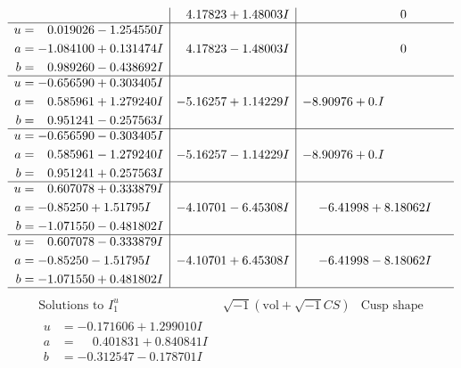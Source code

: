\documentclass[1p]{elsarticle_modified}
\theoremstyle{definition}
\newcommand{\I}{\sqrt{-1}}
\begin{document}
$$\begin{array}{c|c|c}
 & \phantom{-}4.17823 + 1.48003 I & \phantom{-0.000000 } 0 \\ \hline\begin{aligned}
u &= \phantom{-}0.019026 - 1.254550 I \\
a &= -1.084100 + 0.131474 I \\
b &= \phantom{-}0.989260 - 0.438692 I\end{aligned}
 & \phantom{-}4.17823 - 1.48003 I & \phantom{-0.000000 } 0 \\ \hline\begin{aligned}
u &= -0.656590 + 0.303405 I \\
a &= \phantom{-}0.585961 + 1.279240 I \\
b &= \phantom{-}0.951241 - 0.257563 I\end{aligned}
 & -5.16257 + 1.14229 I & -8.90976 + 0. I\phantom{ +0.000000I} \\ \hline\begin{aligned}
u &= -0.656590 - 0.303405 I \\
a &= \phantom{-}0.585961 - 1.279240 I \\
b &= \phantom{-}0.951241 + 0.257563 I\end{aligned}
 & -5.16257 - 1.14229 I & -8.90976 + 0. I\phantom{ +0.000000I} \\ \hline\begin{aligned}
u &= \phantom{-}0.607078 + 0.333879 I \\
a &= -0.85250 + 1.51795 I \\
b &= -1.071550 - 0.481802 I\end{aligned}
 & -4.10701 - 6.45308 I & -6.41998 + 8.18062 I \\ \hline\begin{aligned}
u &= \phantom{-}0.607078 - 0.333879 I \\
a &= -0.85250 - 1.51795 I \\
b &= -1.071550 + 0.481802 I\end{aligned}
 & -4.10701 + 6.45308 I & -6.41998 - 8.18062 I\\
 \hline 
 \end{array}$$\newpage$$\begin{array}{c|c|c}  
\text{Solutions to }I^u_{1}& \I (\text{vol} + \sqrt{-1}CS) & \text{Cusp shape}\\
 \hline 
\begin{aligned}
u &= -0.171606 + 1.299010 I \\
a &= \phantom{-}0.401831 + 0.840841 I \\
b &= -0.312547 - 0.178701 I\end{aligned}

\end{array}$$
\end{document}
